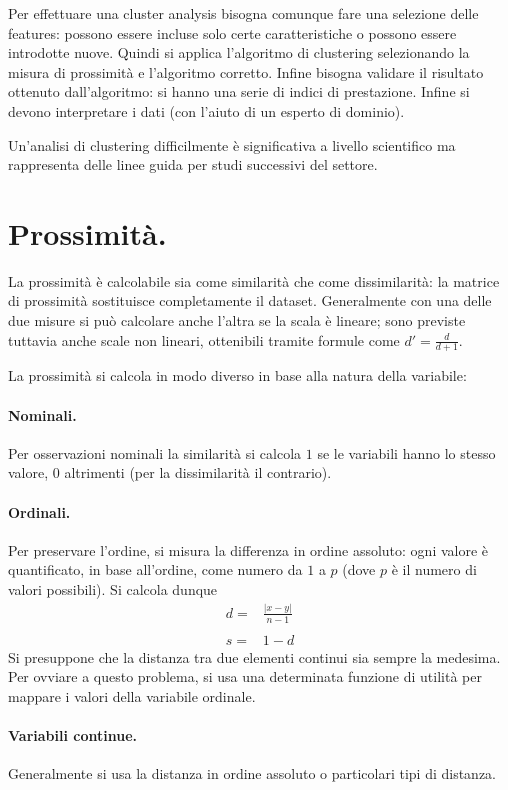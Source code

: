 \documentclass[11pt, a4page, twocolumn]{article}
\begin{document}
Per effettuare una cluster analysis bisogna comunque fare una selezione delle features: possono essere incluse solo certe caratteristiche o possono essere introdotte nuove.
Quindi si applica l'algoritmo di clustering selezionando la misura di prossimità e l'algoritmo corretto.
Infine bisogna validare il risultato ottenuto dall'algoritmo: si hanno una serie di indici di prestazione.
Infine si devono interpretare i dati (con l'aiuto di un esperto di dominio).

Un'analisi di clustering difficilmente è significativa a livello scientifico ma rappresenta delle linee guida per studi successivi del settore.

\section{Prossimità.}
La prossimità è calcolabile sia come similarità che come dissimilarità: la matrice di prossimità sostituisce completamente il dataset.
Generalmente con una delle due misure si può calcolare anche l'altra se la scala è lineare; sono previste tuttavia anche scale non lineari, ottenibili tramite formule come $d' = \frac{d}{d+1}$.

La prossimità si calcola in modo diverso in base alla natura della variabile:

\paragraph{Nominali.}
Per osservazioni nominali la similarità si calcola $1$ se le variabili hanno lo stesso valore, $0$ altrimenti (per la dissimilarità il contrario).

\paragraph{Ordinali.}
Per preservare l'ordine, si misura la differenza in ordine assoluto: ogni valore è quantificato, in base all'ordine, come numero da $1$ a $p$ (dove $p$ è il numero di valori possibili).
Si calcola dunque
\begin{align*}
d =& \frac{{|x - y|}}{n - 1} \\ \\
s =& 1 - d
\end{align*}
Si presuppone che la distanza tra due elementi continui sia sempre la medesima.
Per ovviare a questo problema, si usa una determinata funzione di utilità per mappare i valori della variabile ordinale.

\paragraph{Variabili continue.}
Generalmente si usa la distanza in ordine assoluto o particolari tipi di distanza.
\end{document}
